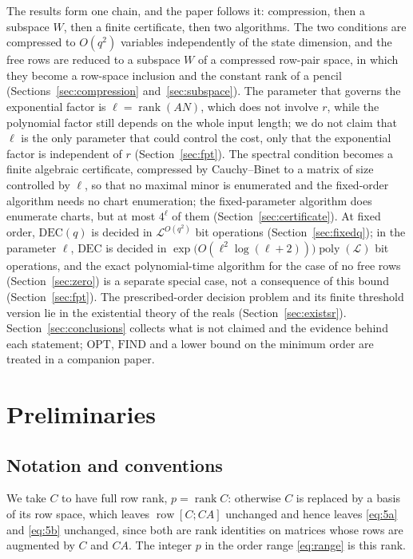\documentclass[journal]{IEEEtran}
\theoremstyle{plainn}
\theoremstyle{remark}
\begin{document}
The results form one chain, and the paper follows it: compression, then a subspace $W$, then a finite
certificate, then two algorithms. The two conditions are compressed to $O(q^2)$ variables
independently of the state dimension, and the free rows are reduced to a subspace $W$ of a compressed
row-pair space, in which they become a row-space inclusion and the constant rank of a pencil
(Sections~\ref{sec:compression} and~\ref{sec:subspace}). The parameter that governs the exponential factor is
$\ell=\operatorname{rank}(AN)$, which does not involve $r$, while the polynomial factor still depends on
the whole input length; we do not claim that $\ell$ is the only parameter that could control the cost,
only that the exponential factor is independent of $r$ (Section~\ref{sec:fpt}).
The spectral condition becomes a finite algebraic certificate, compressed by Cauchy--Binet to a matrix
of size controlled by $\ell$, so that no maximal minor is enumerated and the fixed-order algorithm
needs no chart enumeration; the fixed-parameter algorithm does enumerate charts, but at most
$4^{\ell}$ of them (Section~\ref{sec:certificate}). At fixed order, $\mathrm{DEC}(q)$ is decided in
$\mathcal L^{O(q^2)}$ bit operations (Section~\ref{sec:fixedq}); in the parameter $\ell$, $\mathrm{DEC}$
is decided in $\exp\bigl(O(\ell^2\log(\ell+2))\bigr)\operatorname{poly}(\mathcal L)$ bit operations,
and the exact polynomial-time algorithm for the case of no free rows (Section~\ref{sec:zero}) is a
separate special case, not a consequence of this bound (Section~\ref{sec:fpt}). The prescribed-order
decision problem and its finite threshold version lie in the existential theory of the reals
(Section~\ref{sec:existsr}). Section~\ref{sec:conclusions} collects what is not claimed and the
evidence behind each statement; $\mathrm{OPT}$, $\mathrm{FIND}$ and a lower bound on the minimum
order are treated in a companion paper.

\section{Preliminaries}\label{sec:prelim}

\subsection{Notation and conventions}\label{sec:notation}

We take $C$ to have full row rank, $p=\operatorname{rank}C$: otherwise $C$ is replaced by a basis of
its row space, which leaves $\operatorname{row}[C;CA]$ unchanged and hence leaves \eqref{eq:5a} and
\eqref{eq:5b} unchanged, since both are rank identities on matrices whose rows are augmented by $C$ and
$CA$. The integer $p$ in the order range \eqref{eq:range} is this rank.
\end{document}
